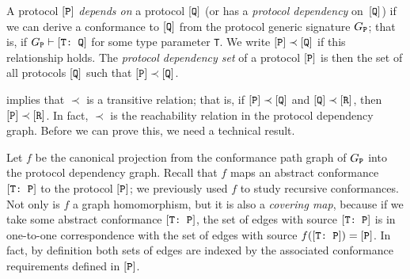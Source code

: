 \documentclass[../generics]{subfiles}
\begin{document}
\begin{definition}
A protocol $[\texttt{P}]$ \emph{depends on} a protocol $[\texttt{Q}]$ (or has a \emph{protocol dependency} on~$[\texttt{Q}]$) if we can derive a conformance to $[\texttt{Q}]$ from the protocol generic signature $G_{\texttt{P}}$; that is, if $G_{\texttt{P}}\vdash[\texttt{T:~Q}]$ for some type parameter \texttt{T}. We write $[\texttt{P}]\prec[\texttt{Q}]$ if this relationship holds. The \emph{protocol dependency set} of a protocol $[\texttt{P}]$ is then the set of all protocols $[\texttt{Q}]$ such that $[\texttt{P}]\prec[\texttt{Q}]$.
\end{definition}

 implies that $\prec$ is a transitive relation; that is, if $[\texttt{P}]\prec[\texttt{Q}]$ and $[\texttt{Q}]\prec[\texttt{R}]$, then $[\texttt{P}]\prec[\texttt{R}]$. In fact, $\prec$ is the reachability relation in the protocol dependency graph. Before we can prove this, we need a technical result.

\smallskip

Let $f$ be the canonical projection from the conformance path graph of $G_{\texttt{P}}$ into the protocol dependency graph. Recall that $f$ maps an abstract conformance $[\texttt{T:~P}]$ to the protocol $[\texttt{P}]$; we previously used $f$ to study recursive conformances. Not only is $f$ a graph homomorphism, but it is also a \emph{covering map}, because if we take some abstract conformance $[\texttt{T:~P}]$, the set of edges with source $[\texttt{T:~P}]$ is in one-to-one correspondence with the set of edges with source $f([\texttt{T:~P}])=[\texttt{P}]$. In fact, by definition both sets of edges are indexed by the associated conformance requirements defined in $[\texttt{P}]$.
\end{document}
